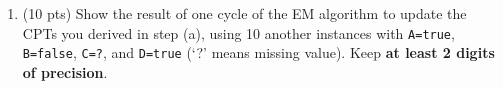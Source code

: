 \documentclass{article}
\begin{document}
\begin{enumerate}
\begin{enumerate}
\vspace{10pt}

\item (10 pts) Show the result of one cycle of the EM algorithm to update the CPTs you derived in step (a), using 10 another instances with \texttt{A=true}, \texttt{B=false}, \texttt{C=?}, and \texttt{D=true} (`?' means missing value). Keep \textbf{at least 2 digits of precision}.



\end{enumerate}
\end{enumerate}
\end{document}
